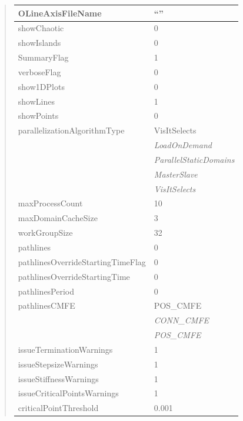 \documentclass[letterpaper,10pt,english]{sphinxmanual}
\begin{document}
\begin{quote}
\begin{longtable}{|l|l|}
\hline
OLineAxisFileName
 & 
``''
\\
\hline
showChaotic
 & 
0
\\
\hline
showIslands
 & 
0
\\
\hline
SummaryFlag
 & 
1
\\
\hline
verboseFlag
 & 
0
\\
\hline
show1DPlots
 & 
0
\\
\hline
showLines
 & 
1
\\
\hline
showPoints
 & 
0
\\
\hline
parallelizationAlgorithmType
 & 
VisItSelects
\\
\hline & 
\emph{LoadOnDemand}
\\
\hline & 
\emph{ParallelStaticDomains}
\\
\hline & 
\emph{MasterSlave}
\\
\hline & 
\emph{VisItSelects}
\\
\hline
maxProcessCount
 & 
10
\\
\hline
maxDomainCacheSize
 & 
3
\\
\hline
workGroupSize
 & 
32
\\
\hline
pathlines
 & 
0
\\
\hline
pathlinesOverrideStartingTimeFlag
 & 
0
\\
\hline
pathlinesOverrideStartingTime
 & 
0
\\
\hline
pathlinesPeriod
 & 
0
\\
\hline
pathlinesCMFE
 & 
POS\_CMFE
\\
\hline & 
\emph{CONN\_CMFE}
\\
\hline & 
\emph{POS\_CMFE}
\\
\hline
issueTerminationWarnings
 & 
1
\\
\hline
issueStepsizeWarnings
 & 
1
\\
\hline
issueStiffnessWarnings
 & 
1
\\
\hline
issueCriticalPointsWarnings
 & 
1
\\
\hline
criticalPointThreshold
 & 
0.001
\\
\hline\end{longtable}

\end{quote}

\begin{DUlineblock}{0em}
\item[] 
\end{DUlineblock}

\begin{DUlineblock}{0em}
\item[] 
\end{DUlineblock}
\end{document}
